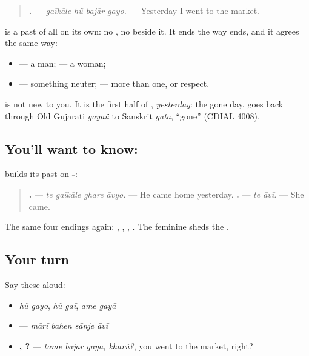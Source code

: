\begin{grammarlens}[title={Grammar Lens: one word does the whole job}]
\begin{quote}
\textbf{   .} — \emph{gaīkāle hũ bajār gayo.} — Yesterday I went to the market.
\end{quote}

\textbf{} is a past of \textbf{} all on its own: no \textbf{}, no \textbf{} beside it. It ends the way \textbf{} ends, and it agrees the same way:

\begin{itemize}
\raggedright
  \item \textbf{} — a man; \textbf{} — a woman;
  \item \textbf{} — something neuter; \textbf{} — more than one, or respect.
\end{itemize}

\textbf{} is not new to you. It is the first half of \textbf{}, \emph{yesterday}: the gone day. \textbf{} goes back through Old Gujarati \emph{gayaü} to Sanskrit \emph{gata}, \textquotedblleft{}gone\textquotedblright{} (CDIAL 4008).
\end{grammarlens}

\subsection*{You'll want to know: }
\textbf{} builds its past on \textbf{-}:

\begin{quote}
\textbf{   .} — \emph{te gaīkāle ghare āvyo.} — He came home yesterday. \textbf{ .} — \emph{te āvī.} — She came.
\end{quote}

The same four endings again: \textbf{}, \textbf{}, \textbf{}, \textbf{}. The feminine sheds the \textbf{}.

\subsection*{Your turn}
Say these aloud:

\begin{itemize}
\raggedright
  \item \emph{hũ gayo}, \emph{hũ gaī}, \emph{ame gayā}
  \item \textbf{   } — \emph{mārī bahen sānje āvī}
  \item \textbf{  , ?} — \emph{tame bajār gayā, kharũ?}, you went to the market, right?
\end{itemize}

